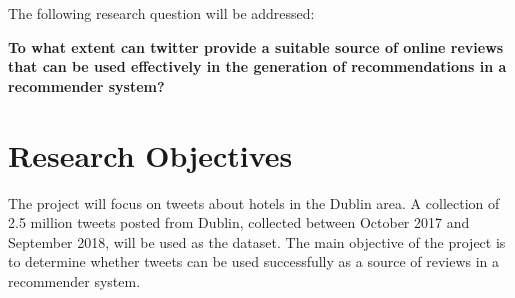 The following research question will be addressed:
\begin{center}
\textbf{To what extent can twitter provide a suitable source of online reviews that can be used effectively in the generation of recommendations in a recommender system?}
\end{center}

\section{Research Objectives}
The project will focus on tweets about hotels in the Dublin area. A collection of 2.5 million tweets posted from Dublin, collected between October 2017 and September 2018, will be used as the dataset. The main objective of the project is to determine whether tweets can be used successfully as a source of reviews in a recommender system.

